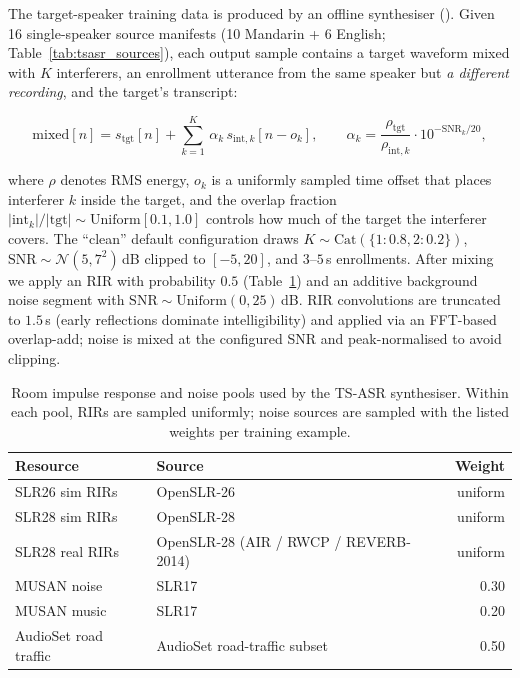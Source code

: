 The target-speaker training data is produced by an offline
synthesiser (). Given 16 single-speaker
source manifests (10 Mandarin + 6 English;
Table~\ref{tab:tsasr_sources}), each output sample contains a
target waveform mixed with $K$ interferers, an enrollment utterance
from the same speaker but \emph{a different recording}, and the
target's transcript:

\begin{equation}
  \mathrm{mixed}[n] = s_\text{tgt}[n] + \sum_{k=1}^{K}\,\alpha_k\,s_{\text{int},k}[n - o_k],
  \qquad
  \alpha_k = \frac{\rho_\text{tgt}}{\rho_{\text{int},k}}\cdot 10^{-\mathrm{SNR}_k/20},
  \label{eq:mixspeakers}
\end{equation}

where $\rho$ denotes RMS energy, $o_k$ is a uniformly sampled time
offset that places interferer $k$ inside the target, and the overlap
fraction $|\text{int}_k|/|\text{tgt}|\!\sim\!\mathrm{Uniform}[0.1, 1.0]$
controls how much of the target the interferer covers. The
``clean'' default configuration draws
$K\!\sim\!\mathrm{Cat}(\{1{:}0.8, 2{:}0.2\})$,
$\mathrm{SNR}\!\sim\!\mathcal{N}(5, 7^2)$\,dB clipped to $[-5, 20]$,
and $3$--$5$\,s enrollments. After mixing we apply an RIR with
probability $0.5$ (Table~\ref{tab:data_rir_noise}) and an additive
background noise segment with $\mathrm{SNR}\!\sim\!\mathrm{Uniform}(0, 25)$\,dB.
RIR convolutions are truncated to $1.5$\,s (early reflections dominate
intelligibility) and applied via an FFT-based overlap-add; noise is mixed
at the configured SNR and peak-normalised to avoid clipping.

\begin{table}[t]
  \caption{Room impulse response and noise pools used by the TS-ASR
    synthesiser. Within each pool, RIRs are sampled uniformly; noise
    sources are sampled with the listed weights per training example.}
  \label{tab:data_rir_noise}
  \centering
  \small
  \begin{tabular}{p{4.0cm}p{6.0cm}r}
    \toprule
    Resource & Source & Weight \\
    \midrule
    SLR26 sim RIRs       & OpenSLR-26 \cite{ko2017studyrir}                            & uniform \\
    SLR28 sim RIRs       & OpenSLR-28 \cite{ko2017studyrir}                            & uniform \\
    SLR28 real RIRs      & OpenSLR-28 (AIR / RWCP / REVERB-2014) \cite{ko2017studyrir} & uniform \\
    \midrule
    MUSAN noise          & SLR17 \cite{snyder2015musan}                                & 0.30 \\
    MUSAN music          & SLR17 \cite{snyder2015musan}                                & 0.20 \\
    AudioSet road traffic & AudioSet road-traffic subset                               & 0.50 \\
    \bottomrule
  \end{tabular}
\end{table}

